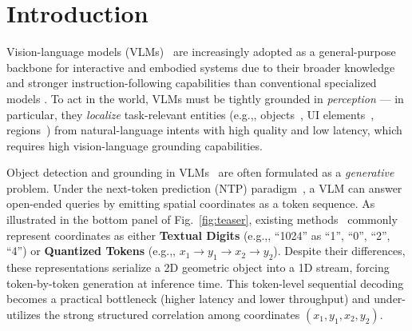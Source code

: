 \documentclass{llmxive}
\providecommand{\eg}{e.g.,\xspace}
\begin{document}
\section{Introduction}
Vision-language models (VLMs)~\citep{bai2025qwen2.5vl, chen2025eagle, wang2025internvl3, huang2026step3, yang2025kwai, deshmukh2025nvidia} are increasingly adopted as a general-purpose backbone for interactive and embodied systems due to their broader knowledge and stronger instruction-following capabilities than conventional specialized models \citep{zhang2022dino, liu2023grounding, carion2020end, ren2016faster}. To act in the world, VLMs \citep{bai2025qwen2.5vl, fu2025llmdet, zhan2024griffon, wang2025internvl3, azzolini2025cosmos} must be tightly grounded in \emph{perception} — in particular, they \emph{localize} task-relevant entities (\eg, objects~\citep{zhang2024llava, jiang2025rexomni, yu2025perception, wang2023exploring}, UI elements~\citep{liu2025scalecua, lin2024showui, feizi2025grounding, nayak2025ui}, regions~\citep{ren2024pixellm, yuan2025pixelrefer, lai2024lisa, cheng2024spatialrgpt, ranzinger2024radio, heinrich2025radiov2}) from natural-language intents with high quality and low latency, which requires high vision-language grounding capabilities. 

Object detection and grounding in VLMs~\citep{zhan2024griffon, li2025lmmdet, yu2025perception, peng2023kosmos, zhang2024ferretv2, jiang2025rexomni, man2025locateanything3d} are often formulated as a \emph{generative} problem. Under the next-token prediction (NTP) paradigm~\citep{chen2021pix2seq, jiang2025rexomni, peng2023kosmos}, a VLM can answer open-ended queries by emitting spatial coordinates as a token sequence. As illustrated in the bottom panel of Fig.~\ref{fig:teaser}, existing methods~\citep{you2023ferret, peng2023kosmos, zhang2024ferretv2, jiang2025rexomni, qi2025cot4det} commonly represent coordinates as either \textbf{Textual Digits} (\eg, ``1024'' as ``1'', ``0'', ``2'', ``4'') or \textbf{Quantized Tokens} (\eg, \(x_1 \rightarrow y_1 \rightarrow x_2 \rightarrow y_2\)). Despite their differences, these representations serialize a 2D geometric object into a 1D stream, forcing token-by-token generation at inference time. This token-level sequential decoding becomes a practical bottleneck (higher latency and lower throughput) and under-utilizes the strong 
structured correlation among coordinates \((x_1, y_1, x_2, y_2)\). 
\end{document}
